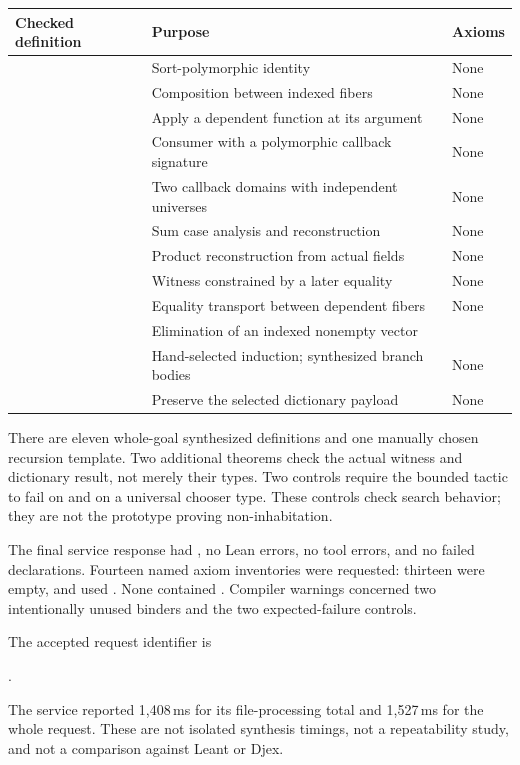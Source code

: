 \begin{longtable}{@{}L{0.29\textwidth}L{0.49\textwidth}L{0.13\textwidth}@{}}
\toprule
Checked definition & Purpose & Axioms \\
\midrule
\endhead
{} & Sort-polymorphic identity & None \\
 & Composition between indexed fibers & None \\
 & Apply a dependent function at its argument & None \\
 & Consumer with a polymorphic callback signature & None \\
 & Two callback domains with independent universes & None \\
 & Sum case analysis and reconstruction & None \\
 & Product reconstruction from actual fields & None \\
 & Witness constrained by a later equality & None \\
 & Equality transport between dependent fibers & None \\
 & Elimination of an indexed nonempty vector &  \\
 & Hand-selected induction; synthesized branch bodies & None \\
 & Preserve the selected dictionary payload & None \\
\bottomrule
\end{longtable}
There are eleven whole-goal synthesized definitions and one manually chosen recursion template. Two additional  theorems check the actual witness and dictionary result, not merely their types. Two  controls require the bounded tactic to fail on  and on a universal chooser type. These controls check search behavior; they are not the prototype proving non-inhabitation.

The final service response had , no Lean errors, no tool errors, and no failed declarations. Fourteen named axiom inventories were requested: thirteen were empty, and  used . None contained . Compiler warnings concerned two intentionally unused binders and the two expected-failure controls.

The accepted request identifier is
\begin{center}\small{}.\end{center}
The service reported 1,408\,ms for its file-processing total and 1,527\,ms for the whole request. These are not isolated synthesis timings, not a repeatability study, and not a comparison against Leant or Djex.

